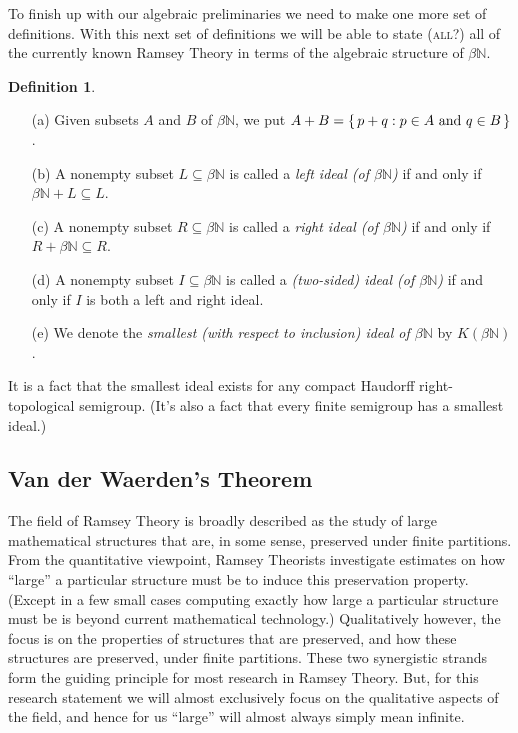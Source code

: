 \documentclass[12pt]{article}
\theoremstyle{plain}
\theoremstyle{definition}
\newtheorem{defn}[thm]{Definition}
\newcommand{\bbN}{\mathbb{N}}
\begin{document}
To finish up with our algebraic preliminaries we need to make one more
set of definitions.
With this next set of definitions we will be able to state
(\textsc{all?}) all of the currently known Ramsey Theory in terms of
the algebraic structure of $\beta\bbN$.
  \begin{defn}
    \begin{itemize}
      \item[(a)] Given subsets $A$ and $B$ of $\beta\bbN$, we put $A +
        B = \{\, p+q : \hbox{$p \in A$ and $q \in B$} \,\}$.
      \item[(b)] A nonempty subset $L \subseteq \beta\bbN$ is called a
        \textsl{left ideal (of $\beta\bbN$)} if and only if $\beta\bbN
        + L \subseteq L$.
      \item[(c)] A nonempty subset $R \subseteq \beta\bbN$ is called a
        \textsl{right ideal (of $\beta\bbN$)} if and only if $R +
        \beta\bbN \subseteq R$.
      \item[(d)] A nonempty subset $I \subseteq \beta\bbN$ is called a
        \textsl{(two-sided) ideal (of $\beta\bbN$)} if and only if $I$
        is both a left and right ideal.
      \item[(e)] We denote the \textsl{smallest (with respect to
          inclusion) ideal of $\beta\bbN$} by $K(\beta\bbN)$.
    \end{itemize}
  \end{defn}
It is a fact\cite[Theorem 2.8]{Hindman:1998fk} that the smallest ideal
exists for any compact Haudorff right-topological semigroup. 
(It's also a fact that every finite semigroup has a smallest ideal.)

\subsection{Van der Waerden's Theorem}
The field of Ramsey Theory is broadly described as the study of large
mathematical structures that are, in some sense, preserved under
finite partitions.
From the quantitative viewpoint, Ramsey Theorists investigate
estimates on how ``large'' a particular structure must be to induce
this preservation property.
(Except in a few small cases computing exactly how large a particular
structure must be is beyond current mathematical technology.)
Qualitatively however, the focus is on the properties of structures that are preserved, and how these structures are preserved, under finite partitions.
These two synergistic strands form the guiding principle for most
research in Ramsey Theory.
But, for this research statement we will almost exclusively focus on
the qualitative aspects of the field, and hence for us ``large'' will
almost always simply mean infinite.
\end{document}
